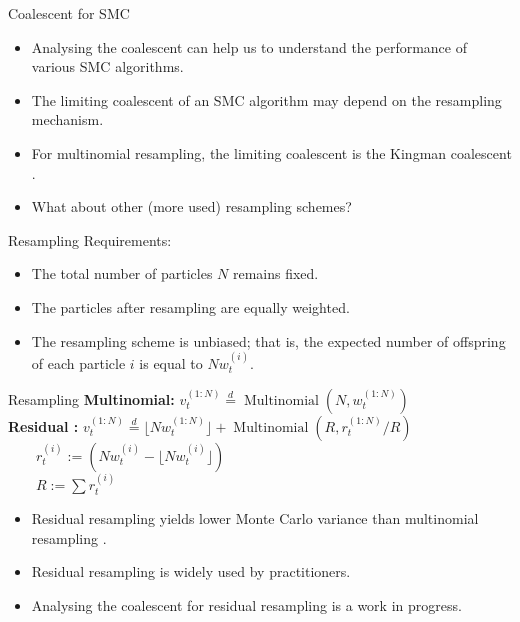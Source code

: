 \documentclass[aspectratio=169]{beamer}
\theoremstyle{definition}
\newcommand{\eqdist}{\overset{d}{=}}
\newcommand{\vt}[2][t]{v_{#1}^{(#2)}}
\newcommand{\wt}[2][t]{w_{#1}^{(#2)}}
\begin{document}
\begin{frame}{Coalescent for SMC}
\begin{itemize}
\item Analysing the coalescent can help us to understand the performance of various SMC algorithms.
\item The limiting coalescent of an SMC algorithm may depend on the resampling mechanism.
\item For multinomial resampling, the limiting coalescent is the Kingman coalescent \cite{koskela2018}.
\item What about other (more used) resampling schemes?
\end{itemize}
\end{frame}

\begin{frame}{Resampling}
Requirements:\\[12pt]
\begin{itemize}
\item The total number of particles $N$ remains fixed. 
\item The particles after resampling are equally weighted. 
\item The resampling scheme is unbiased; that is, the expected number of offspring of each particle $i$ is equal to $N\wt{i}$.
\end{itemize}
\end{frame}

\begin{frame}{Resampling}
\textbf{Multinomial:}
$\vt{1:N} \eqdist \operatorname{Multinomial}(N, \wt{1:N})$\\[12pt]

\textbf{Residual \cite{liu1998}:}
$\vt{1:N} \eqdist \lfloor N \wt{1:N} \rfloor +  \operatorname{Multinomial}(R, r_t^{(1:N)}/R)$\\[7pt]
$\qquad r_t^{(i)} := (N \wt{i} - \lfloor N \wt{i}\rfloor)$\\[7pt]
$\qquad R:= \sum r_t^{(i)}$\\[12pt]

\begin{itemize}
\item Residual resampling yields lower Monte Carlo variance than multinomial resampling \cite{douc2005}.
\item Residual resampling is widely used by practitioners.
\item Analysing the coalescent for residual resampling is a work in progress.
\end{itemize}
\end{frame}
\end{document}

